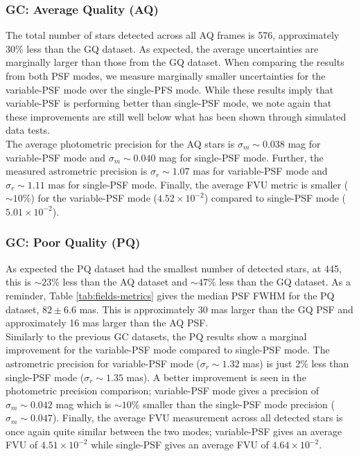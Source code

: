 \documentclass[]{spie}  %
\begin{document}
\subsubsection{GC: Average Quality (AQ)} \label{sec:results-gc-AQ}
The total number of stars detected across all AQ frames is 576, approximately 30\% less than the GQ dataset. As expected, the average uncertainties are marginally larger than those from the GQ dataset. When comparing the results from both PSF modes, we measure marginally smaller uncertainties for the variable-PSF mode over the single-PFS mode. While these results imply that variable-PSF is performing better than single-PSF mode, we note again that these improvements are still well below what has been shown through simulated data tests.
\\
\indent The average photometric precision for the AQ stars is $\sigma_{{m}}{\sim}0.038$ mag for variable-PSF mode and $\sigma_{{m}}{\sim}0.040$ mag for single-PSF mode. Further, the measured astrometric precision is $\sigma_{{r}}{\sim}1.07$ mas for variable-PSF mode and $\sigma_{{r}}{\sim}1.11$ mas for single-PSF mode. Finally, the average FVU metric is smaller (${\sim}10$\%) for the variable-PSF mode ($4.52\times10^{-2}$) compared to single-PSF mode ($5.01\times10^{-2}$).

\subsubsection{GC: Poor Quality (PQ)} \label{sec:results-gc-PQ}
As expected the PQ dataset had the smallest number of detected stars, at 445, this is ${\sim}23$\% less than the AQ dataset and ${\sim}47$\% less than the GQ dataset. As a reminder, Table \ref{tab:fields-metrics} gives the median PSF FWHM for the PQ dataset, $82 \pm 6.6$ mas. This is approximately 30 mas larger than the GQ PSF and approximately 16 mas larger than the AQ PSF.
\\
\indent Similarly to the previous GC datasets, the PQ results show a marginal improvement for the variable-PSF mode compared to single-PSF mode. The astrometric precision for variable-PSF mode ($\sigma_{{r}}{\sim}1.32$ mas) is just 2\% less than single-PSF mode ($\sigma_{{r}}{\sim}1.35$ mas). A better improvement is seen in the photometric precision comparison; variable-PSF mode gives a precision of $\sigma_{{m}}{\sim}0.042$ mag which is ${\sim}10$\% smaller than the single-PSF mode precision ($\sigma_{{m}}{\sim}0.047$). Finally, the average FVU measurement across all detected stars is once again quite similar between the two modes; variable-PSF gives an average FVU of $4.51\times10^{-2}$ while single-PSF gives an average FVU of $4.64\times10^{-2}$.
\end{document}
